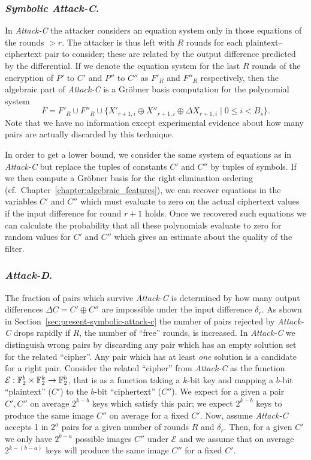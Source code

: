\subsubsection{\emph{Symbolic Attack-C}.}
In \emph{Attack-C} the attacker considers an equation system only in those equations of the rounds $> r$. The attacker is thus left with $R$ rounds for each plaintext--ciphertext pair to consider; these are related by the output difference predicted by the differential. If we denote the equation system for the last $R$ rounds of the encryption of $P'$ to $C'$ and $P''$ to $C''$ as $F'_R$ and $F''_R$ respectively, then the algebraic part of \emph{Attack-C} is a Gröbner basis computation for the polynomial system $$F = F'_R \cup F''_R \cup \{X'_{r+1,i} \oplus X''_{r+1,i} \oplus \Delta X_{r+1,i} \mid 0 \leq i < B_s\}.$$ Note that we have no information except experimental evidence about how many pairs are actually discarded by this technique.

In order to get a lower bound, we consider the same system of equations as in \emph{Attack-C} but replace the tuples of constants $C'$ and $C''$ by tuples of symbols. If we then compute a Gröbner basis for the right elimination ordering (cf.\ Chapter~\ref{chapter:algebraic_features}), we can recover equations in the variables $C'$ and $C''$ which must evaluate to zero on the actual ciphertext values if the input difference for round $r+1$ holds. Once we recovered such equations we can calculate the probability that all these polynomials evaluate to zero for random values for $C'$ and $C''$ which gives an estimate about the quality of the filter.

\subsubsection{\emph{Attack-D}.}
The fraction of pairs which survive \emph{Attack-C} is determined by how many output differences $\Delta C = C' \oplus C''$ are impossible under the input difference $\delta_r$. As shown in Section~\ref{sec:present-symbolic-attack-c} the number of pairs rejected by \emph{Attack-C} drops rapidly if $R$, the number of ``free'' rounds, is increased. In \emph{Attack-C} we distinguish wrong pairs by discarding any pair which has an empty solution set for the related ``cipher''. Any pair which has at least \emph{one} solution is a candidate for a right pair. Consider the related ``cipher'' from \emph{Attack-C} as the function $\mathcal{E}: \mathbb{F}_2^b \times \mathbb{F}_2^k \to \mathbb{F}_2^b$, that is as a function taking a $k$-bit key and mapping a $b$-bit ``plaintext'' ($C'$) to the $b$-bit ``ciphertext'' ($C''$). We expect for a given a pair $C',C''$ on average $2^{k - b}$ keys which satisfy this pair; we expect $2^{k - b}$ keys to produce the same image $C''$ on average for a fixed $C'$. Now, assume \emph{Attack-C} accepts 1 in $2^a$ pairs for a given number of rounds $R$ and $\delta_r$. Then, for a given $C'$ we only have $2^{b - a}$ possible images $C''$ under $\mathcal{E}$ and we assume that on average $2^{k - (b - a)}$ keys will produce the same image $C''$ for a fixed $C'$.

